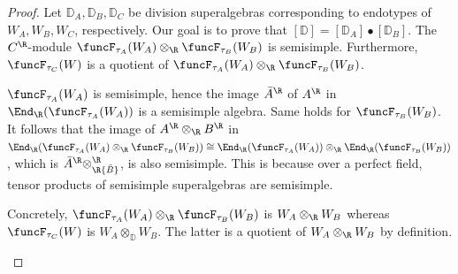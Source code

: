 \documentclass[12pt]{amsart}
\begin{document}
\begin{proof}
Let $\mathbb D_A,\mathbb D_B,\mathbb D_C$ be division superalgebras corresponding to endotypes of $W_A,W_B,W_C$, respectively. Our goal is to prove that 
$[\mathbb D]=[\mathbb D_A]\bullet [\mathbb D_B]$. 
The $C^\R$-module $\funcF_{\tau_A}(W_A)\otimes_\R \funcF_{\tau_B}(W_B)$ is semisimple. 
Furthermore, $\funcF_{\tau_C}(W)$ is a quotient of $\funcF_{\tau_A}(W_A)\otimes_\R \funcF_{\tau_B}(W_B)$. 



\begin{details}
$\funcF_{\tau_A}(W_A)$ is semisimple, hence the image ${\bar A}^\R$ of $A^\R$ in $\End_\R(\funcF_{\tau_A}(W_A))$ is a semisimple algebra. Same holds for $\funcF_{\tau_B}(W_B)$. It follows that  
the image of $A^\R\otimes_\R B^\R$ in $\End_\R(\funcF_{\tau_A}(W_A)\otimes_\R\funcF_{\tau_B}(W_B))\cong \End_\R(\funcF_{\tau_A}(W_A))\otimes_\R\End_\R(\funcF_{\tau_B}(W_B))$, which  is ${\bar A}^\R\otimes_\R {\bar B}^\R$, is also semisimple.
This is because over a perfect field, tensor products of semisimple superalgebras are semisimple. 
\end{details}


\begin{details}
Concretely, $\funcF_{\tau_A}(W_A)\otimes_\R \funcF_{\tau_B}(W_B)$ is $W_A\otimes_\R W_B$ whereas $\funcF_{\tau_C}(W)$ is $W_A\otimes_\mathbb D W_B$. The latter is a quotient of $W_A\otimes_\R W_B$ by definition. 
\end{details}


\end{proof}
\end{document}
